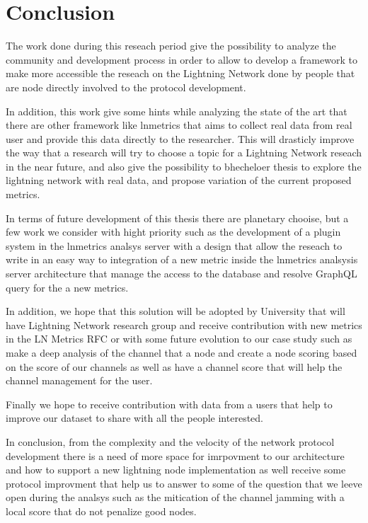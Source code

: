 \chapter{Conclusion}

The work done during this reseach period give the possibility
to analyze the {\LN} community and development process in order to allow
to develop a framework to make more accessible the reseach on the Lightning
Network done by people that are node directly involved to the  {\LN} protocol
development.

In addition, this work give some hints while analyzing the state of the art
that there are other framework like lnmetrics that aims to collect real data
from real user and provide this data directly to the researcher.
This will drasticly improve the way that a research will try to choose a topic
for a Lightning Network reseach in the near future, and also give the possibility
to bhecheloer thesis to explore the lightning network with real data, and propose
variation of the current proposed metrics.

In terms of future development of this thesis there are planetary chooise, but
a few work we consider with hight priority such as the development of a plugin system
in the lnmetrics analsys server with a design that allow the reseach to write in
an easy way to integration of a new metric inside the lnmetrics analsysis server
architecture that manage the access to the database and resolve GraphQL query
for the a new metrics.

In addition, we hope that this solution will be adopted by University that will
have Lightning Network research group and receive contribution with new metrics
in the LN Metrics RFC or with some future evolution to our case study such as
make a deep analysis of the channel that a node and create a node scoring based on the
score of our channels as well as have a channel score that will help the channel
management for the user.

Finally we hope to receive contribution with data from a {\LN} users that
help to improve our dataset to share with all the people interested.

In conclusion, from the complexity and the velocity of the {\LN} network protocol
development there is a need of more space for imrpovment to our architecture and how
to support a new lightning node implementation as well receive some protocol improvment
that help us to answer to some of the question
that we leeve open during the analsys such as the mitication of the channel jamming with a
local score that do not penalize good {\LN} nodes.
